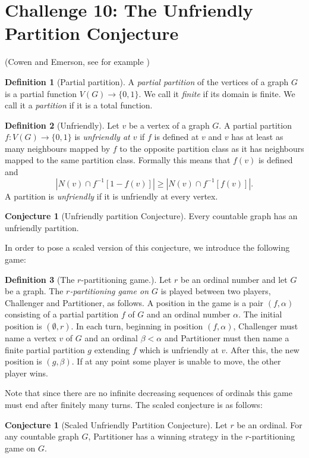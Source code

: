 \documentclass[12pt]{article}
\numberwithin{equation}{section}
\theoremstyle{definition}
\newtheorem{definition}{Definition}
\newtheorem{conjecture}[theorem]{Conjecture}
\begin{document}
\section*{Challenge 10: The Unfriendly Partition Conjecture}

(Cowen and Emerson, see for example \cite{aharoni1990unfriendly})

\begin{definition}[Partial partition]
A {\em partial partition} of the vertices of a graph $G$ is a partial function $V(G) \to \{0,1\}$. We call it {\em finite} if its domain is finite. We call it a {\em partition} if it is a total function.
\end{definition}

\begin{definition}[Unfriendly]
Let $v$ be a vertex of a graph $G$. A partial partition $f \colon V(G) \to \{0,1\}$ is {\em unfriendly at $v$} if $f$ is defined at $v$ and $v$ has at least as many neighbours mapped by $f$ to the opposite partition class as it has neighbours mapped to the same partition class. Formally this means that $f(v)$ is defined and
$$|N(v) \cap f^{-1}[1 - f(v)]| \ge |N(v) \cap f^{-1}[f(v)]|.$$
A partition is {\em unfriendly} if it is unfriendly at every vertex.
\end{definition}

\begin{conjecture}[Unfriendly partition Conjecture]
Every countable graph has an unfriendly partition.
\end{conjecture}

In order to pose a scaled version of this conjecture, we introduce the following game:

\begin{definition}[The $r$-partitioning game.]
Let $r$ be an ordinal number and let $G$ be a graph. The {\em $r$-partitioning game on $G$} is played between two players, Challenger and Partitioner, as follows. A position in the game is a pair $(f, \alpha)$ consisting of a partial partition $f$ of $G$ and an ordinal number $\alpha$. The initial position is $(\emptyset, r)$. In each turn, beginning in position $(f, \alpha)$, Challenger must name a vertex $v$ of $G$ and an ordinal $\beta < \alpha$ and Partitioner must then name a finite partial partition $g$ extending $f$ which is unfriendly at $v$. After this, the new position is $(g, \beta)$. If at any point some player is unable to move, the other player wins.
\end{definition}

Note that since there are no infinite decreasing sequences of ordinals this game must end after finitely many turns. The scaled conjecture is as follows:

\begin{conjecture}[Scaled Unfriendly Partition Conjecture]
Let $r$ be an ordinal. For any countable graph $G$, Partitioner has a winning strategy in the $r$-partitioning game on $G$.
\end{conjecture}

\printbibliography
\end{document}
